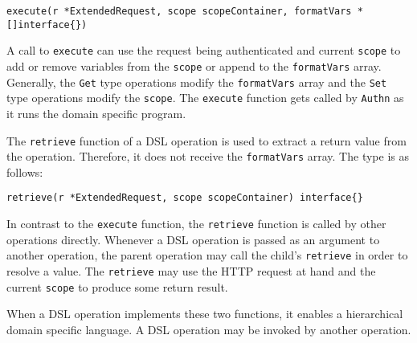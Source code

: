 \begin{lstlisting}
execute(r *ExtendedRequest, scope scopeContainer, formatVars *[]interface{})
\end{lstlisting}

A call to \lstinline{execute} can use the request being authenticated and current \lstinline{scope} to add or remove variables from the \lstinline{scope} or append to the \lstinline{formatVars} array. Generally, the \lstinline{Get} type operations modify the \lstinline{formatVars} array and the \lstinline{Set} type operations modify the \lstinline{scope}. The \lstinline{execute} function gets called by \lstinline{Authn} as it runs the domain specific program.

The \lstinline{retrieve} function of a DSL operation is used to extract a return value from the operation. Therefore, it does not receive the \lstinline{formatVars} array. The type is as follows:

\begin{lstlisting}
retrieve(r *ExtendedRequest, scope scopeContainer) interface{}
\end{lstlisting}

In contrast to the \lstinline{execute} function, the \lstinline{retrieve} function is called by other operations directly. Whenever a DSL operation is passed as an argument to another operation, the parent operation may call the child's \lstinline{retrieve} in order to resolve a value. The \lstinline{retrieve} may use the HTTP request at hand and the current \lstinline{scope} to produce some return result.

When a DSL operation implements these two functions, it enables a hierarchical domain specific language. A DSL operation may be invoked by another operation.



\iffalse

\fi
